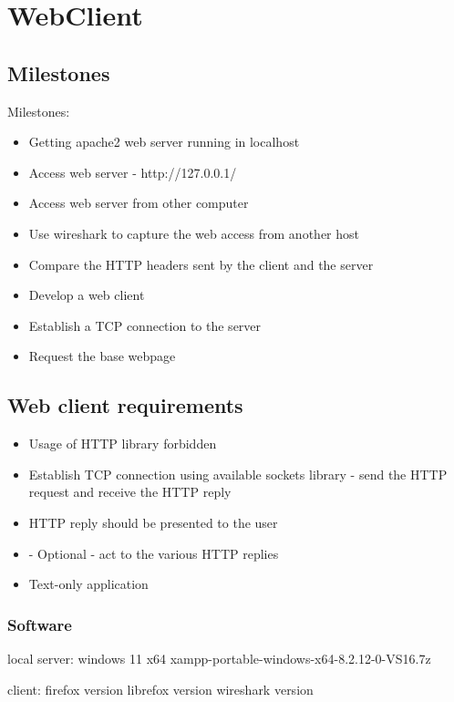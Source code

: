 \documentclass[11pt,a4paper]{report}
\begin{document}
\chapter{WebClient}
    \section{Milestones}
        Milestones:
        \begin{itemize}
            \item Getting apache2 web server running in localhost
            \item Access web server - http://127.0.0.1/
            \item Access web server from other computer
            \item Use wireshark to capture the web access from another host
            \item Compare the HTTP headers sent by the client and the server
            \item Develop a web client
            \item Establish a TCP connection to the server
            \item Request the base webpage
        \end{itemize}
        
    \section{Web client requirements}
        \begin{itemize}
            \item Usage of HTTP library forbidden
            \item Establish TCP connection using available sockets library - send the HTTP request and receive the HTTP reply
            \item HTTP reply should be presented to the user
            \item - Optional - act to the various HTTP replies
            \item Text-only application
        \end{itemize}

    \subsection{Software}
        \item local server:
            \subitem windows 11 x64
            \subitem xampp-portable-windows-x64-8.2.12-0-VS16.7z
        \item client:
            \subitem firefox version
            \subitem librefox version
            \subitem wireshark version
    
\end{document}
